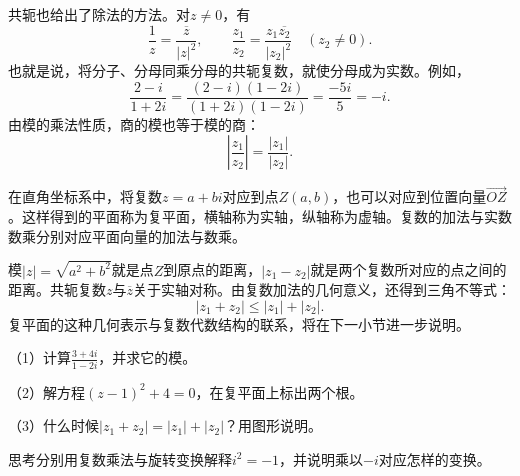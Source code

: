 共轭也给出了除法的方法。对\(z \ne 0\)，有
\begin{equation}
    \frac{1}{z} = \frac{\overline{z}}{\left| z \right|^{2}} , \qquad
    \frac{z_{1}}{z_{2}} = \frac{z_{1} \overline{z_{2}}}{\left| z_{2} \right|^{2}} \quad \left( z_{2} \ne 0 \right) .
\end{equation}
也就是说，将分子、分母同乘分母的共轭复数，就使分母成为实数。例如，
\begin{equation}
    \frac{2 - i}{1 + 2 i}
    = \frac{\left( 2 - i \right) \left( 1 - 2 i \right)}{\left( 1 + 2 i \right) \left( 1 - 2 i \right)}
    = \frac{- 5 i}{5} = - i .
\end{equation}
由模的乘法性质，商的模也等于模的商：
\begin{equation}
    \left| \frac{z_{1}}{z_{2}} \right| = \frac{\left| z_{1} \right|}{\left| z_{2} \right|} .
\end{equation}

在直角坐标系中，将复数\(z = a + b i\)对应到点\(Z \left( a , b \right)\)，也可以对应到位置向量\(\vec{O Z}\)。这样得到的平面称为{\heiti{}复平面}，横轴称为实轴，纵轴称为虚轴。复数的加法与实数数乘分别对应平面向量的加法与数乘。

模\(\left| z \right| = \sqrt{a^{2} + b^{2}}\)就是点\(Z\)到原点的距离，\(\left| z_{1} - z_{2} \right|\)就是两个复数所对应的点之间的距离。共轭复数\(z\)与\(\overline{z}\)关于实轴对称。由复数加法的几何意义，还得到三角不等式：
\begin{equation}
    \left| z_{1} + z_{2} \right| \le \left| z_{1} \right| + \left| z_{2} \right| .
\end{equation}
复平面的这种几何表示与复数代数结构的联系，将在下一小节进一步说明。

\begin{samepage}
\begin{example}
（1）计算\(\frac{3 + 4 i}{1 - 2 i}\)，并求它的模。
\par\nopagebreak[4]

（2）解方程\(\left( z - 1 \right)^{2} + 4 = 0\)，在复平面上标出两个根。
\par\nopagebreak[4]

（3）什么时候\(\left| z_{1} + z_{2} \right| = \left| z_{1} \right| + \left| z_{2} \right|\)？用图形说明。
\end{example}
\par
\end{samepage}

{\kaiti{}思考\quad 分别用复数乘法与旋转变换解释\(i^{2} = - 1\)，并说明乘以\(- i\)对应怎样的变换。}

